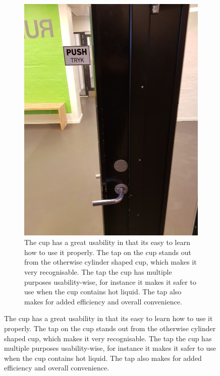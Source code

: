 \documentclass[11pt]{article}
\begin{document}
\begin{figure}[!h]
\begin{subfigure}[t]{0.5\textwidth}
        \includegraphics[scale=0.4]{InteraktionsDesign/Assets/door.jpg}
        \caption{The cup has a great usability in that its easy to learn how to use it properly. The tap on the cup stands out from the otherwise cylinder shaped cup, which makes it very recognisable. The tap the cup has multiple purposes usability-wise, for instance it makes it safer to use when the cup contains hot liquid. The tap also makes for added efficiency and overall convenience.}
        \label{fig:cup}
    \end{subfigure}
\end{figure}
\end{document}
